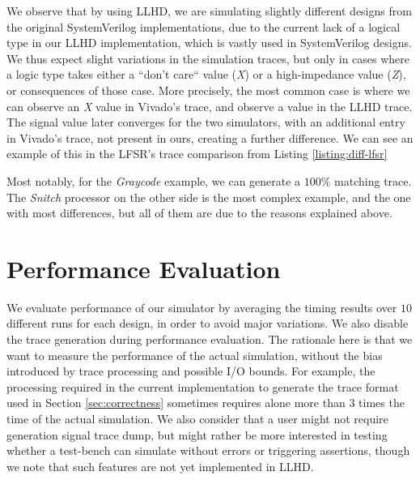 We observe that by using LLHD, we are simulating slightly different designs from the original SystemVerilog implementations, due to the current lack of a logical type in our LLHD implementation, which is vastly used in SystemVerilog designs. We thus expect slight variations in the simulation traces, but only in cases where a logic type takes either a “don't care“ value (\textit{X}) or a high-impedance value (\textit{Z}), or consequences of those case. More precisely, the most common case is where we can observe an \textit{X} value in Vivado's trace, and observe a value in the LLHD trace. The signal value later converges for the two simulators, with an additional entry in Vivado's trace, not present in ours, creating a further difference. We can see an example of this in the LFSR's trace comparison from Listing \ref{listing:diff-lfsr}


Most notably, for the \textit{Graycode} example, we can generate a $100\%$ matching trace. The \textit{Snitch} processor on the other side is the most complex example, and the one with most differences, but all of them are due to the reasons explained above.


\section{Performance Evaluation}
We evaluate performance of our simulator by averaging the timing results over $10$ different runs for each design, in order to avoid major variations. We also disable the trace generation during performance evaluation. The rationale here is that we want to measure the performance of the actual simulation, without the bias introduced by trace processing and possible I/O bounds. For example, the processing required in the current implementation to generate the trace format used in Section \ref{sec:correctness} sometimes requires alone more than $3$ times the time of the actual simulation. We also consider that a user might not require generation signal trace dump, but might rather be more interested in testing whether a test-bench can simulate without errors or triggering assertions, though we note that such features are not yet implemented in LLHD.

